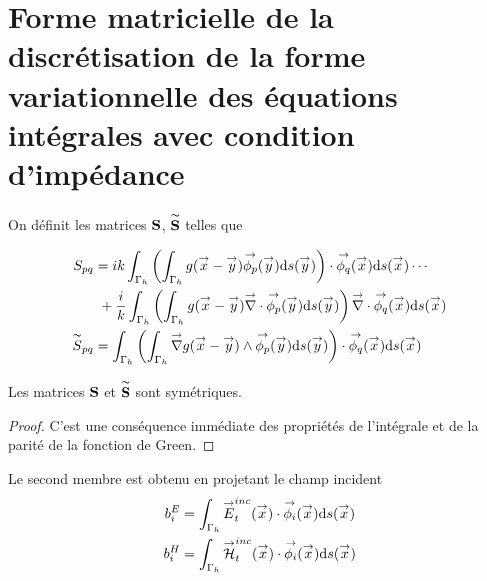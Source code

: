 
\section{Forme matricielle de la discrétisation de la forme variationnelle des équations intégrales avec condition d'impédance}

  \begin{defn}
    On définit les matrices \(\mS\), \(\mSt\) telles que

    \begin{align*}
      S_{pq}
        &= ik \int_{\Gamma_h} \left( \int_{\Gamma_h} g(\vx - \vy) \phip(\vy) \dd{s}(\vy) \right) \cdot \phiq (\vx)\dd{s}(\vx) \cdots\\
        \notag&~+ \frac{i}{k}\int_{\Gamma_h} \left( \int_{\Gamma_h} g(\vx - \vy) \vdiv \phip (\vy) \dd{s}(\vy) \right) \vdiv \phiq(\vx)\dd{s}(\vx)\\
      \tilde{S}_{pq}
        &= \int_{\Gamma_h} \left( \int_{\Gamma_h} \vgrad g(\vx - \vy) \pvect \phip(\vy) \dd{s}(\vy) \right) \cdot \phiq(\vx)\dd{s}(\vx)
    \end{align*}
  \end{defn}

  \begin{prop}
    Les matrices \(\mS\) et \(\mSt\) sont symétriques.
  \end{prop}
  \begin{proof}
    C'est une conséquence immédiate des propriétés de l'intégrale et de la parité de la fonction de Green.
  \end{proof}

  Le second membre est obtenu en projetant le champ incident
    \begin{align*}
      b_i^E &= \int_{\Gamma_h} \vE_t^{inc}(\vx) \cdot \phii(\vx)\dd{s}(\vx) \\
      b_i^H &= \int_{\Gamma_h} \vH_t^{inc}(\vx) \cdot \phii(\vx)\dd{s}(\vx)
    \end{align*}

